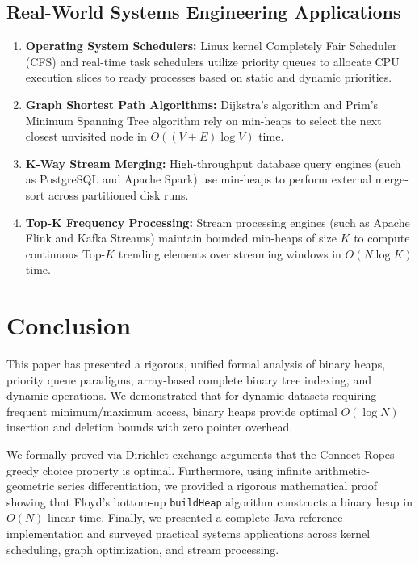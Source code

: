 \documentclass[10pt,journal,compsoc,onecolumn]{IEEEtran}
\begin{document}
\subsection{Real-World Systems Engineering Applications}
\begin{enumerate}
    \item \textbf{Operating System Schedulers:} Linux kernel Completely Fair Scheduler (CFS) and real-time task schedulers utilize priority queues to allocate CPU execution slices to ready processes based on static and dynamic priorities.
    \item \textbf{Graph Shortest Path Algorithms:} Dijkstra's algorithm and Prim's Minimum Spanning Tree algorithm rely on min-heaps to select the next closest unvisited node in $O((V + E) \log V)$ time.
    \item \textbf{K-Way Stream Merging:} High-throughput database query engines (such as PostgreSQL and Apache Spark) use min-heaps to perform external merge-sort across partitioned disk runs.
    \item \textbf{Top-K Frequency Processing:} Stream processing engines (such as Apache Flink and Kafka Streams) maintain bounded min-heaps of size $K$ to compute continuous Top-$K$ trending elements over streaming windows in $O(N \log K)$ time.
\end{enumerate}

\section{Conclusion}
\label{sec:conclusion}

This paper has presented a rigorous, unified formal analysis of binary heaps, priority queue paradigms, array-based complete binary tree indexing, and dynamic operations. We demonstrated that for dynamic datasets requiring frequent minimum/maximum access, binary heaps provide optimal $O(\log N)$ insertion and deletion bounds with zero pointer overhead.

We formally proved via Dirichlet exchange arguments that the Connect Ropes greedy choice property is optimal. Furthermore, using infinite arithmetic-geometric series differentiation, we provided a rigorous mathematical proof showing that Floyd's bottom-up \texttt{buildHeap} algorithm constructs a binary heap in $O(N)$ linear time. Finally, we presented a complete Java reference implementation and surveyed practical systems applications across kernel scheduling, graph optimization, and stream processing.
\end{document}
